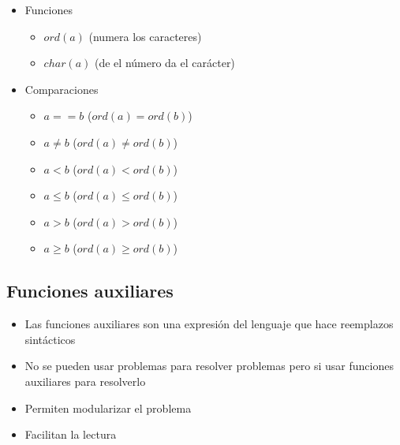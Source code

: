 \documentclass[a4paper,10pt]{article}
\begin{document}
\begin{itemize}
\begin{itemize}
			\item Funciones
			\begin{itemize}
				\item $ord(a)$ (numera los caracteres)
				\item $char(a)$ (de el número da el carácter)
			\end{itemize}
			\item Comparaciones
			\begin{itemize}
				\item $a == b$ ($ord(a) = ord(b)$)
				\item $a \neq b$ ($ord(a) \neq ord(b)$)
				\item $a < b$ ($ord(a) < ord(b)$)
				\item $a \leq b$ ($ord(a) \leq ord(b)$)
				\item $a > b$ ($ord(a) > ord(b)$)
				\item $a \geq b$ ($ord(a) \geq ord(b)$)
			\end{itemize}
		\end{itemize}
	\end{itemize}
\subsection{Funciones auxiliares}
	\begin{itemize}
		\item Las funciones auxiliares son una expresión del lenguaje que hace reemplazos sintácticos
		\item No se pueden usar problemas para resolver problemas pero si usar funciones auxiliares para resolverlo
		\item Permiten modularizar el problema
		\item Facilitan la lectura
	\end{itemize}
\end{document}
